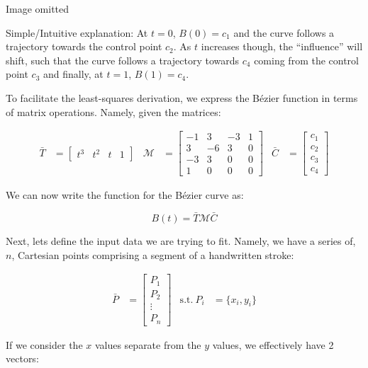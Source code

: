 \documentclass{article}
\begin{document}
\begin{center}
  \large
  Image omitted
\end{center}

Simple/Intuitive explanation: At $t=0$, $B(0)=c_1$ and the curve follows a trajectory towards the control point $c_2$. As $t$ increases though, the ``influence'' will shift, such that the curve follows a trajectory towards $c_4$ coming from the control point $c_3$ and finally, at $t=1$, $B(1)=c_4$.

To facilitate the least-squares derivation, we express the B\'ezier function in terms of matrix operations. Namely, given the matrices:

\begin{align*}
  \bar{T} &= \left[\begin{array}{cccc}t^3 & t^2 & t & 1\end{array}\right] &
  \mathcal{M} &= \left[
    \begin{array}{rrrr}
      -1 &  3 & -3 & 1 \\
       3 & -6 &  3 & 0 \\
      -3 &  3 &  0 & 0 \\
       1 &  0 &  0 & 0
    \end{array}
  \right] &
  \bar{C} &= \left[\begin{array}{r}c_1\\c_2\\c_3\\c_4\end{array}\right]
\end{align*}

We can now write the function for the B\'ezier curve as:

\[B(t)=\bar{T}\mathcal{M}\bar{C}\]

Next, lets define the input data we are trying to fit. Namely, we have a series of, $n$, Cartesian points comprising a segment of a handwritten stroke:

\begin{align*}
  \bar{P} &= \left[\begin{array}{c}
    P_1 \\ P_2 \\ \vdots \\ P_n
  \end{array}\right] &
  \textrm{s.t.}\ P_i &= \{x_i,y_i\}
\end{align*}

If we consider the $x$ values separate from the $y$ values, we effectively have 2 vectors:
\end{document}
